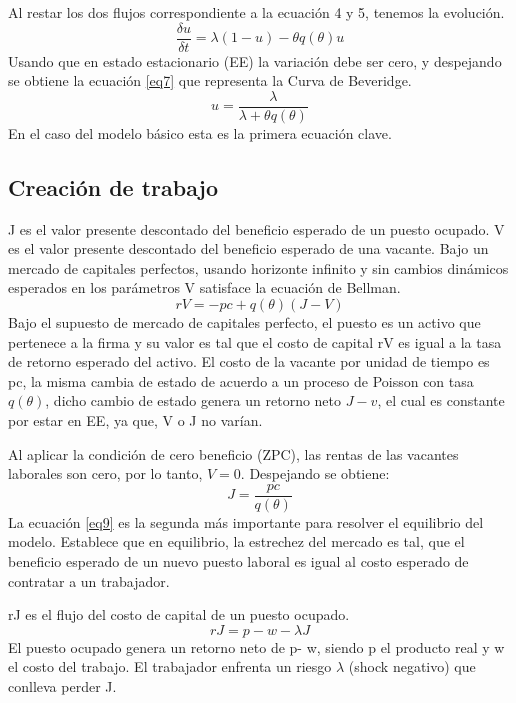 \documentclass[12pt,oneside]{reedthesis}
\begin{document}
Al restar los dos flujos correspondiente a la ecuación 4 y 5, tenemos la evolución.
\begin{equation} \label{eq6}
\frac{\delta u}{\delta t} = \lambda(1-u)-\theta q(\theta)u
\end{equation}
Usando que en estado estacionario (EE) la variación debe ser cero, y despejando se obtiene la ecuación \eqref{eq7} que representa la Curva de Beveridge.
\begin{equation} \label{eq7}
u = \frac{\lambda}{\lambda+\theta q(\theta)}
\end{equation}
En el caso del modelo básico esta es la primera ecuación clave.

\subsection{Creación de trabajo}

J es el valor presente descontado del beneficio esperado de un puesto ocupado. V es el valor presente descontado del beneficio esperado de una vacante. Bajo un mercado de capitales perfectos, usando horizonte infinito y sin cambios dinámicos esperados en los parámetros V satisface la ecuación de Bellman.
\begin{equation} \label{eq8}
rV = - pc + q(\theta)(J-V)
\end{equation}
Bajo el supuesto de mercado de capitales perfecto, el puesto es un activo que pertenece a la firma y su valor es tal que el costo de capital rV es igual a la tasa de retorno esperado del activo. El costo de la vacante por unidad de tiempo es pc, la misma cambia de estado de acuerdo a un proceso de Poisson con tasa \(q(\theta)\), dicho cambio de estado genera un retorno neto \(J-v\), el cual es constante por estar en EE, ya que, V o J no varían.

Al aplicar la condición de cero beneficio (ZPC), las rentas de las vacantes laborales son cero, por lo tanto, \(V=0\). Despejando se obtiene:
\begin{equation} \label{eq9}
J = \frac{pc}{q(\theta)}
\end{equation}
La ecuación \eqref{eq9} es la segunda más importante para resolver el equilibrio del modelo. Establece que en equilibrio, la estrechez del mercado es tal, que el beneficio esperado de un nuevo puesto laboral es igual al costo esperado de contratar a un trabajador.

rJ es el flujo del costo de capital de un puesto ocupado.
\begin{equation} \label{eq10}
rJ = p - w - \lambda J
\end{equation}
El puesto ocupado genera un retorno neto de p- w, siendo p el producto real y w el costo del trabajo. El trabajador enfrenta un riesgo \(\lambda\) (shock negativo) que conlleva perder J.
\end{document}

